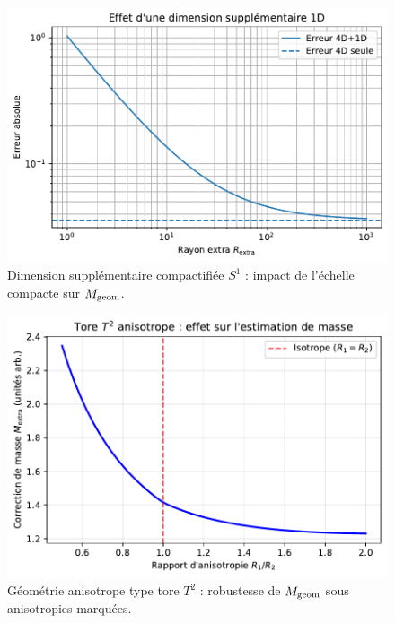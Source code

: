 \documentclass[11pt,a4paper]{article}
\theoremstyle{remark}
\begin{document}
\begin{figure}[htbp]
  \centering
  \includegraphics[width=\linewidth]{fig_extra_dimension_effect_improved.pdf}
  \caption{Dimension supplémentaire compactifiée $S^1$ : impact de l’échelle compacte sur $M_{\rm geom}$.}
  \label{fig:fig_extra_dimension_effect_improved}
\end{figure}

\begin{figure}[htbp]
  \centering
  \includegraphics[width=\linewidth]{fig_torus_anisotropic.pdf}
  \caption{Géométrie anisotrope type tore $T^2$ : robustesse de $M_{\rm geom}$ sous anisotropies marquées.}
  \label{fig:fig_torus_anisotropic}
\end{figure}
\end{document}
